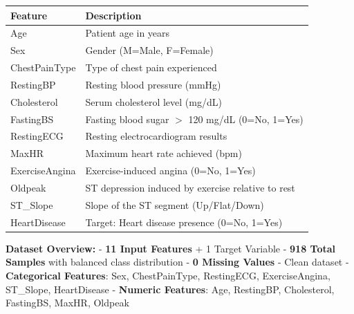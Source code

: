 \documentclass[11pt]{article}
\begin{document}
{\def\LTcaptype{none} %
\begin{longtable}[]{@{}p{2.5cm}p{9cm}@{}}
	\toprule\noalign{}
	\textbf{Feature} & \textbf{Description} \\
	\midrule\noalign{}
	\endhead
	\bottomrule\noalign{}
	\endlastfoot
	Age & Patient age in years \\
	Sex & Gender (M=Male, F=Female) \\
	ChestPainType & Type of chest pain experienced \\
	RestingBP & Resting blood pressure (mmHg) \\
	Cholesterol & Serum cholesterol level (mg/dL) \\
	FastingBS & Fasting blood sugar $>$ 120 mg/dL (0=No, 1=Yes) \\
	RestingECG & Resting electrocardiogram results \\
	MaxHR & Maximum heart rate achieved (bpm) \\
	ExerciseAngina & Exercise-induced angina (0=No, 1=Yes) \\
	Oldpeak & ST depression induced by exercise relative to rest \\
	ST\_Slope & Slope of the ST segment (Up/Flat/Down) \\
	HeartDisease & Target: Heart disease presence (0=No, 1=Yes) \\
\end{longtable}
}

\textbf{Dataset Overview:} - \textbf{11 Input Features} + 1 Target
Variable - \textbf{918 Total Samples} with balanced class distribution -
\textbf{0 Missing Values} - Clean dataset - \textbf{Categorical
Features}: Sex, ChestPainType, RestingECG, ExerciseAngina, ST\_Slope,
HeartDisease - \textbf{Numeric Features}: Age, RestingBP, Cholesterol,
FastingBS, MaxHR, Oldpeak
\end{document}
